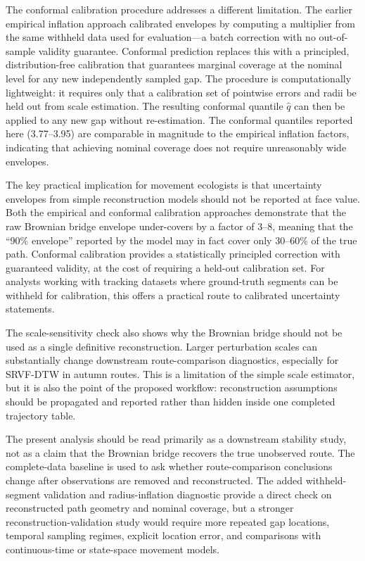 \documentclass[pdflatex,sn-vancouver-num]{sn-jnl}
\begin{document}
The conformal calibration procedure addresses a different limitation. The earlier empirical inflation approach calibrated envelopes by computing a multiplier from the same withheld data used for evaluation---a batch correction with no out-of-sample validity guarantee. Conformal prediction replaces this with a principled, distribution-free calibration that guarantees marginal coverage at the nominal level for any new independently sampled gap. The procedure is computationally lightweight: it requires only that a calibration set of pointwise errors and radii be held out from scale estimation. The resulting conformal quantile $\hat q$ can then be applied to any new gap without re-estimation. The conformal quantiles reported here (3.77--3.95) are comparable in magnitude to the empirical inflation factors, indicating that achieving nominal coverage does not require unreasonably wide envelopes.

The key practical implication for movement ecologists is that uncertainty envelopes from simple reconstruction models should not be reported at face value. Both the empirical and conformal calibration approaches demonstrate that the raw Brownian bridge envelope under-covers by a factor of 3--8, meaning that the ``90\% envelope'' reported by the model may in fact cover only 30--60\% of the true path. Conformal calibration provides a statistically principled correction with guaranteed validity, at the cost of requiring a held-out calibration set. For analysts working with tracking datasets where ground-truth segments can be withheld for calibration, this offers a practical route to calibrated uncertainty statements.

The scale-sensitivity check also shows why the Brownian bridge should not be used as a single definitive reconstruction. Larger perturbation scales can substantially change downstream route-comparison diagnostics, especially for SRVF-DTW in autumn routes. This is a limitation of the simple scale estimator, but it is also the point of the proposed workflow: reconstruction assumptions should be propagated and reported rather than hidden inside one completed trajectory table.

The present analysis should be read primarily as a downstream stability study, not as a claim that the Brownian bridge recovers the true unobserved route. The complete-data baseline is used to ask whether route-comparison conclusions change after observations are removed and reconstructed. The added withheld-segment validation and radius-inflation diagnostic provide a direct check on reconstructed path geometry and nominal coverage, but a stronger reconstruction-validation study would require more repeated gap locations, temporal sampling regimes, explicit location error, and comparisons with continuous-time or state-space movement models.
\end{document}
